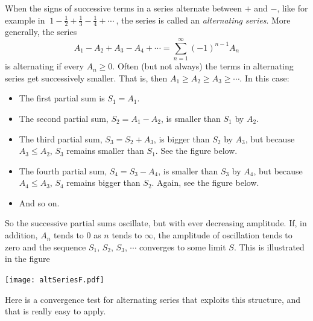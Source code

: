 When the signs of successive terms in a series alternate between
$+$ and $-$, like for example in
$
\ 1-\frac{1}{2} +\frac{1}{3}-\frac{1}{4}+ \cdots\
$,
the series is called an \emph{alternating series}. More generally,
the series
\begin{equation*}
A_1-A_2+A_3-A_4+\cdots =\sum_{n=1}^\infty (-1)^{n-1} A_n
\end{equation*}
is alternating if every $A_n\ge 0$.
Often (but not always) the terms in alternating series get successively
smaller. That is, then $A_1\ge A_2 \ge A_3 \ge \cdots$. In this case:
\begin{itemize}
\item The first partial sum is $S_1=A_1$.
\item The second partial sum, $S_2=A_1-A_2$, is smaller than $S_1$
by $A_2$.
\item The third partial sum, $S_3=S_2+A_3$, is bigger than $S_2$
by $A_3$, but because $A_3\le A_2$, $S_3$ remains smaller than $S_1$.
See the figure below.
\item The fourth partial sum, $S_4=S_3-A_4$, is smaller than $S_3$
by $A_4$, but because $A_4\le A_3$, $S_4$ remains bigger than $S_2$.
Again, see the figure below.
\item And so on.
\end{itemize}
So the successive partial sums oscillate, but with ever decreasing
amplitude. If, in addition, $A_n$ tends to $0$ as $n$ tends to
$\infty$, the amplitude of oscillation tends to zero and the
sequence $S_1$, $S_2$, $S_3$, $\cdots$ converges to some limit $S$.
This is illustrated in the figure
\begin{efig}
\begin{center}
     \texttt{[image: altSeriesF.pdf]}
\end{center}
\end{efig}
Here is a convergence test for alternating series that exploits
this structure, and that is really easy to apply.




